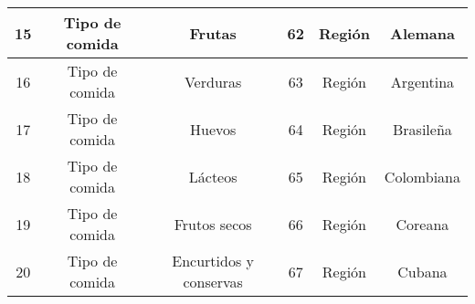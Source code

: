 \begin{table}[h]
\begin{center}
\begin{tabular}{ | c | c | c | c | c | c |}
        \midrule
        15 & Tipo de comida & Frutas  & 62 & Región   & Alemana \\
        \midrule
        16 & Tipo de comida & Verduras  & 63 & Región   & Argentina \\
        \midrule
        17 & Tipo de comida & Huevos  & 64 & Región   & Brasileña \\
        \midrule
        18 & Tipo de comida & Lácteos  & 65 & Región   & Colombiana \\
        \midrule
        19 & Tipo de comida & Frutos secos  & 66 & Región   & Coreana \\
        \midrule
        20 & Tipo de comida & Encurtidos y conservas  & 67 & Región   & Cubana \\
        \bottomrule
      \end{tabular}
    \end{center}
  \end{table}
